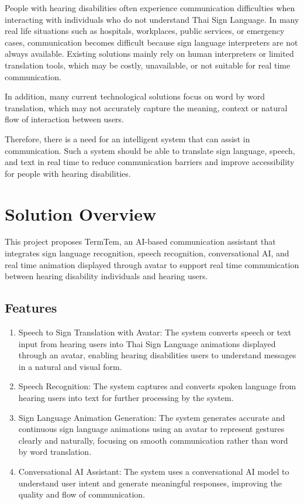 People with hearing disabilities often experience communication difficulties when interacting with individuals 
who do not understand Thai Sign Language. In many real life situations such as hospitals, workplaces, public services, 
or emergency cases, communication becomes difficult because sign language interpreters are not always available.
Existing solutions mainly rely on human interpreters or limited translation tools, which may be costly, unavailable, 
or not suitable for real time communication. 

In addition, many current technological solutions focus on word by word translation, which may not accurately capture the meaning,
context or natural flow of interaction between users.

Therefore, there is a need for an intelligent system that can assist in communication. Such a system should be able to translate
sign language, speech, and text in real time to reduce communication barriers and improve accessibility for people with hearing disabilities.
\newpage
\section{Solution Overview}
\label{section:solution-overview}

This project proposes TermTem, an AI-based communication assistant that integrates sign language recognition, speech recognition, 
conversational AI, and real time animation displayed through avatar to support real time communication between hearing disability individuals and hearing users.

\subsection{Features}
\label{subsection:features}

\begin{enumerate}[leftmargin=80pt]
    \item Speech to Sign Translation with Avatar: The system converts speech or text input from hearing users into Thai Sign Language animations displayed through an avatar, enabling hearing disabilities users to understand messages in a natural and visual form.
    \item Speech Recognition: The system captures and converts spoken language from hearing users into text for further processing by the system.
    \item Sign Language Animation Generation: The system generates accurate and continuous sign language animations using an avatar to represent gestures clearly and naturally, focusing on smooth communication rather than word by word translation.
    \item Conversational AI Assistant: The system uses a conversational AI model to understand user intent and generate meaningful responses, improving the quality and flow of communication.
\end{enumerate}
